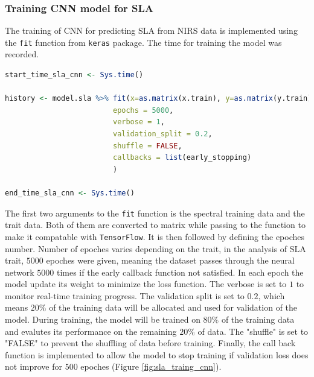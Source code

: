\documentclass[12pt,a4paper]{report}
\begin{document}
\subsubsection*{Training CNN model for SLA}
The training of CNN for predicting SLA from NIRS data is implemented using the \texttt{fit} function from \texttt{keras} package. The time for training the model was recorded. \\

\begin{lstlisting}[language=R, style=mystyle]
start_time_sla_cnn <- Sys.time()

history <- model.sla %>% fit(x=as.matrix(x.train), y=as.matrix(y.train),
                         epochs = 5000,
                         verbose = 1,
                         validation_split = 0.2,
                         shuffle = FALSE,
                         callbacks = list(early_stopping)
                         )
                         
end_time_sla_cnn <- Sys.time()
\end{lstlisting}

The first two arguments to the \texttt{fit} function is the spectral training data and the trait data. Both of them are converted to matrix while passing to the function to make it compatable with \texttt{TensorFlow}. It is then followed by defining the epoches number. Number of epoches varies depending on the trait, in the analysis of SLA trait, $5000$ epoches were given, meaning the dataset passes through the neural network $5000$ times if the early callback function not satisfied.  In each epoch the model update its weight to minimize the loss function. The verbose is set to $1$ to monitor real-time training progress. The validation split is set to $0.2$, which means $20\%$ of the training data will be allocated and used for validation of the model. During training, the model will be trained on $80\%$ of the training data and evalutes its performance on the remaining $20\%$ of data. The "shuffle" is set to "FALSE" to prevent the shuffling of data before training. Finally, the call back function is implemented to allow the model to stop training if validation loss does not improve for $500$ epoches (Figure \ref{fig:sla_traing_cnn}). \\
\end{document}
